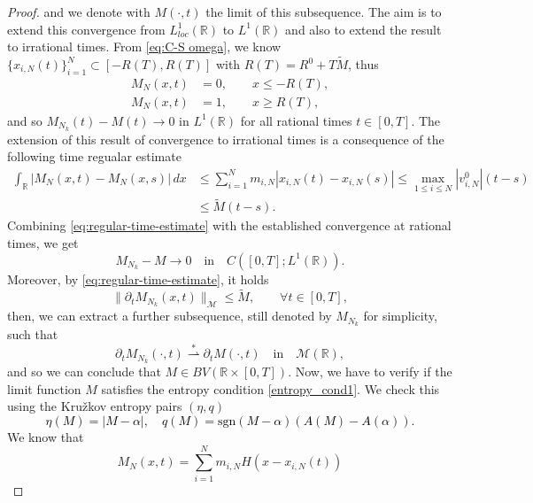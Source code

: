 \documentclass[11pt,a4paper,oneside]{amsart}
\newcommand\R{\mathbb{R}}
\newcommand\weakstar{\overset{\ast}{\rightharpoonup}}
\begin{document}
\begin{proof}
        and we denote with $M(\cdot,t)$ the limit of this subsequence. The aim is to extend this convergence from $L^1_{loc}(\R)$ to $L^1(\R)$ 
        and also to extend the result to irrational times. From %
        \eqref{eq:C-S omega}, 
        we know $\{x_{i,N}(t)\}_{i=1}^N\subset[-R(T),R(T)]$ with $R(T)=R^0+T\tilde M$, thus
        \begin{align*}
            M_N(x,t)&=0,\qquad x\leq -R(T),\\
            M_N(x,t)&=1,\qquad x\geq R(T),
        \end{align*}
        and so $M_{N_k}(t)-M(t)\to0$ in $L^1(\R)$ for all rational times $t\in[0,T]$.\newline
        The extension of this result of convergence to irrational times is a consequence of the following time regualar estimate
        \begin{align}
            \label{eq:regular-time-estimate}
            \int_\R |M_N(x,t)-M_N(x,s)|\,dx&\leq\sum_{i=1}^N m_{i,N}|x_{i,N}(t)-x_{i,N}(s)|\leq \max_{1\leq i\leq N}|v_{i,N}^0|(t-s)\\
            \nonumber
            &\leq \tilde M(t-s).
        \end{align}
        Combining \eqref{eq:regular-time-estimate} with the established convergence at rational times, we get
        \begin{equation}\label{eq:L1_convergence}
        M_{N_k}-M\to0\quad\text{in}\quad C([0,T];L^1(\R)).
        \end{equation}
        Moreover, by \eqref{eq:regular-time-estimate}, it holds
        $$
        \|\partial_t M_{N_k}(x,t)\|_{\mathcal{M}}\leq \tilde M,\qquad\forall t\in[0,T],
        $$
        then, we can extract a further subsequence, still denoted by $M_{N_k}$ for simplicity, such that
        $$
        \partial_t M_{N_k}(\cdot,t)\weakstar\partial_tM(\cdot,t)\quad\text{in}\quad \mathcal{M}(\R),
        $$
        and so we can conclude that $M\in BV(\R\times[0,T])$. 
        Now, we have to verify if the limit function $M$ satisfies the entropy condition \eqref{entropy_cond1}. 
        We check this using the Kru\v{z}kov entropy pairs $(\eta,q)$ %
        \textcolor{black}{
        \begin{equation}\label{def:Kruzkov}
          \eta(M)=|M-\alpha|,\quad  q(M)=\text{sgn}(M-\alpha)(A(M)-A(\alpha)).
        \end{equation}
        }
        We know that
        $$
        M_N(x,t)=\sum_{i=1}^N m_{i,N}H(x-x_{i,N}(t))
$$
\end{proof}
\end{document}
